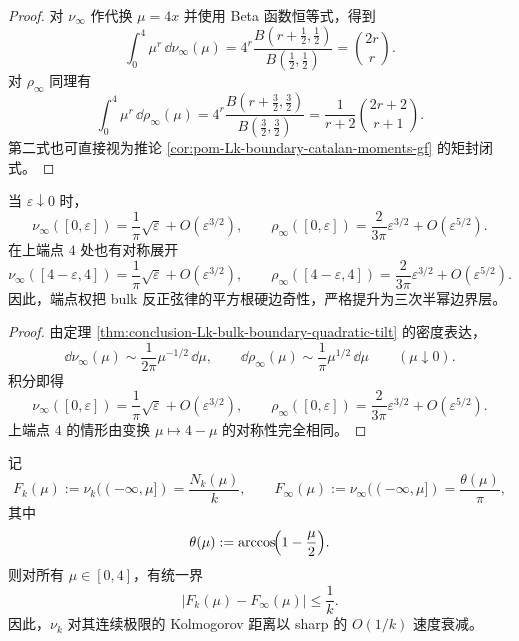 \begin{proof}
对 \(\nu_\infty\) 作代换 \(\mu=4x\) 并使用 Beta 函数恒等式，得到
\[
\int_0^4 \mu^r\,\dd\nu_\infty(\mu)
=
4^r\frac{B(r+\tfrac12,\tfrac12)}{B(\tfrac12,\tfrac12)}
=\binom{2r}{r}.
\]
对 \(\rho_\infty\) 同理有
\[
\int_0^4 \mu^r\,\dd\rho_\infty(\mu)
=
4^r\frac{B(r+\tfrac32,\tfrac32)}{B(\tfrac32,\tfrac32)}
=\frac{1}{r+2}\binom{2r+2}{r+1}.
\]
第二式也可直接视为推论 \ref{cor:pom-Lk-boundary-catalan-moments-gf} 的矩封闭式。
\end{proof}

\begin{corollary}[端点加权把硬边奇性抬升一阶]\label{cor:conclusion-Lk-hard-edge-lift}
当 \(\varepsilon\downarrow 0\) 时，
\[
\nu_\infty([0,\varepsilon])
=
\frac{1}{\pi}\sqrt{\varepsilon}+O(\varepsilon^{3/2}),
\qquad
\rho_\infty([0,\varepsilon])
=
\frac{2}{3\pi}\varepsilon^{3/2}+O(\varepsilon^{5/2}).
\]
在上端点 \(4\) 处也有对称展开
\[
\nu_\infty([4-\varepsilon,4])
=
\frac{1}{\pi}\sqrt{\varepsilon}+O(\varepsilon^{3/2}),
\qquad
\rho_\infty([4-\varepsilon,4])
=
\frac{2}{3\pi}\varepsilon^{3/2}+O(\varepsilon^{5/2}).
\]
因此，端点权把 bulk 反正弦律的平方根硬边奇性，严格提升为三次半幂边界层。
\end{corollary}

\begin{proof}
由定理 \ref{thm:conclusion-Lk-bulk-boundary-quadratic-tilt} 的密度表达，
\[
\dd\nu_\infty(\mu)\sim \frac{1}{2\pi}\mu^{-1/2}\,\dd\mu,
\qquad
\dd\rho_\infty(\mu)\sim \frac{1}{\pi}\mu^{1/2}\,\dd\mu
\qquad(\mu\downarrow 0).
\]
积分即得
\[
\nu_\infty([0,\varepsilon])=\frac{1}{\pi}\sqrt{\varepsilon}+O(\varepsilon^{3/2}),
\qquad
\rho_\infty([0,\varepsilon])=\frac{2}{3\pi}\varepsilon^{3/2}+O(\varepsilon^{5/2}).
\]
上端点 \(4\) 的情形由变换 \(\mu\mapsto 4-\mu\) 的对称性完全相同。
\end{proof}

\begin{theorem}\label{thm:conclusion-Lk-kolmogorov-sharp-1overk}
记
\[
F_k(\mu):=\nu_k((-\infty,\mu])=\frac{N_k(\mu)}{k},
\qquad
F_\infty(\mu):=\nu_\infty((-\infty,\mu])=\frac{\theta(\mu)}{\pi},
\]
其中
\[
\theta(\mu):=\arccos\!\Bigl(1-\frac{\mu}{2}\Bigr).
\]
则对所有 \(\mu\in[0,4]\)，有统一界
\[
\bigl|F_k(\mu)-F_\infty(\mu)\bigr|\le \frac{1}{k}.
\]
因此，\(\nu_k\) 对其连续极限的 Kolmogorov 距离以 sharp 的 \(O(1/k)\) 速度衰减。
\end{theorem}

